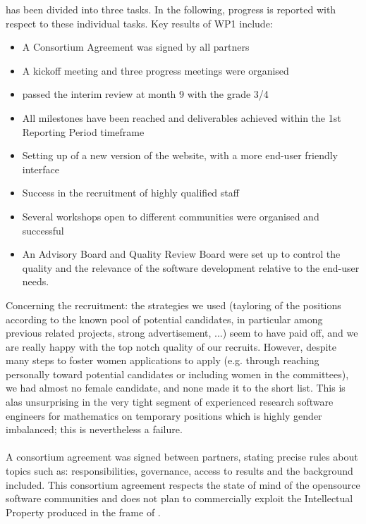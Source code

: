 \documentclass{deliverablereport}
\begin{document}
 has been divided into three tasks. In the following, progress is reported with respect to these individual tasks.
Key results of WP1 include:

\begin{itemize}
\item{A Consortium Agreement was signed by all partners}
\item{A kickoff meeting and three progress meetings were organised}
\item{\ODK passed the interim review at month 9 with the grade 3/4}
\item{All milestones have been reached and deliverables achieved within the 1st Reporting Period timeframe}
\item{Setting up of a new version of the \ODK website, with a more end-user friendly interface}
\item{Success in the recruitment of highly qualified staff}
\item{Several workshops open to different communities were organised and successful}
\item{An Advisory Board and Quality Review Board were set up to control the quality and the relevance of the software development relative to the end-user needs.}
\end{itemize}

Concerning the recruitment: the strategies we used (tayloring of the
positions according to the known pool of potential candidates, in
particular among previous related projects, strong advertisement, ...)
seem to have paid off, and we are really happy with the top notch
quality of our recruits. However, despite many steps to foster women
applications to apply (e.g. through reaching personally toward
potential candidates or including women in the committees), we had
almost no female candidate, and none made it to the short list. This
is alas unsurprising in the very tight segment of experienced research
software engineers for mathematics on temporary positions which is
highly gender imbalanced; this is nevertheless a failure.

\paragraph{}

A consortium agreement was signed
between partners, stating precise rules about topics such as:
responsibilities, governance, access to results and the background
included.  This consortium agreement respects the state of mind of the opensource software communities and does not plan to commercially exploit the Intellectual Property produced in the frame of \ODK.
\end{document}
